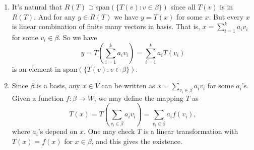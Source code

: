 \begin{enumerate}
\item It's natural that $R(T)\supset $span$(\{T(v):v\in \beta \})$ since all $T(v)$ is in $R(T)$. And for any $y\in R(T)$ we have $y=T(x)$ for some $x$. But every $x$ is linear combination of finite many vectors in basis. That is, $x=\sum_{i=1}^k{a_iv_i}$ for some $v_i\in \beta $. So we have 
\[y=T(\sum_{i=1}^k{a_iv_i})=\sum_{i=1}^k{a_iT(v_i)}\]
is an element in span$(\{T(v):v\in \beta \})$.
\item Since $\beta$ is a basis, any $x\in V$ can be written as $x=\sum_{v_i\in\beta}{a_iv_i}$ for some $a_i$'s.  Given a function $f:\beta\rightarrow W$, we may define the mapping $T$ as 
\[T(x)=T(\sum_{v_i\in\beta}{a_iv_i})=\sum_{v_i\in\beta}a_if(v_i),\]
where $a_i$'s depend on $x$.  One may check $T$ is a linear transformation with $T(x)=f(x)$ for $x\in\beta$, and this gives the existence.  


\end{enumerate}
